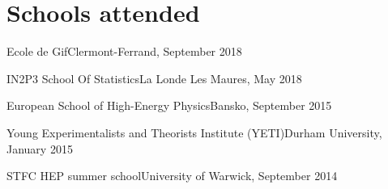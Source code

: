 \documentclass[contbibnum,titleabove]{simplecv}
\newcommand\dateditem[2]{\vspace{0.5em}#1\hfill#2\par}
\newcommand\topictitle[3]{\par\dateditem{#1}{#3}{\color{darkgray}#2}}
\begin{document}
	\section{Schools attended}
	\topictitle{Ecole de Gif}{}{Clermont-Ferrand, September 2018}
	\topictitle{IN2P3 School Of Statistics}{}{La Londe Les Maures, May 2018}
	\topictitle{European School of High-Energy Physics}{}{Bansko, September 2015}
	\topictitle{Young Experimentalists and Theorists Institute (YETI)}{}{Durham University, January 2015}
	\topictitle{STFC HEP summer school}{}{University of Warwick, September 2014}
\end{document}

